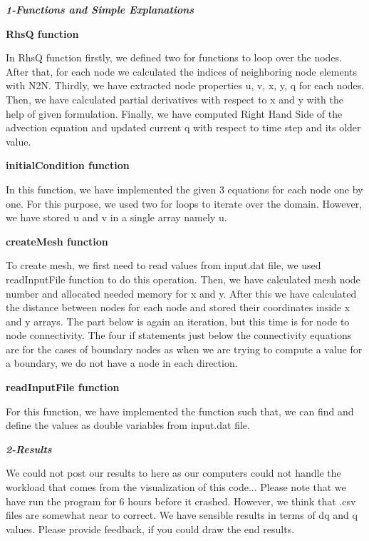 \documentclass[a4paper,12pt]{article} %
\begin{document}
\vspace{12pt}
\vspace{12pt}

{\Large \bf \textbf{\textit{1-Functions and Simple Explanations}}}
\vspace{12pt}
\vspace{12pt}

{\Large \textbf{RhsQ function}}

In RhsQ function firstly,  we defined two for functions to loop over the nodes. After that, for each node we calculated the indices of neighboring node elements with N2N. Thirdly, we have extracted node properties u, v, x, y, q for each nodes. Then, we have calculated partial derivatives with respect to x and y with the help of given formulation.  Finally, we have computed Right Hand Side of the advection equation and updated current q  with respect to time step and its older value.

\vspace{12pt}

{\Large \textbf{initialCondition function}}

In this function, we have implemented the given 3 equations for each node one by one. For this purpose, we used two for loops to iterate over the domain. However, we have stored u and v in a single array namely u.

\vspace{12pt}

{\Large \textbf{createMesh function}}

To create mesh, we first need to read values from input.dat file, we used readInputFile function to do this operation. Then, we have calculated mesh node number and allocated needed memory for x and y. After this we have calculated the distance between nodes for each node and stored their coordinates inside x and y arrays. The part below is again an iteration, but this time is for node to node connectivity. The four if statements just below the connectivity equations are for the cases of boundary nodes as when we are trying to compute a value for a boundary, we do not have a node in each direction.

\vspace{12pt}

{\Large \textbf{readInputFile function}}

For this function, we have implemented the function such that, we can find and define the values as double variables from input.dat file.

\vspace{12pt}

\newpage
{\Large \bf \textbf{\textit{2-Results}}}

\vspace{12pt}

We could not post our results to here as our computers could not handle the workload that comes from the visualization of this code... Please note that we have run the program for 6 hours before it crashed. However, we think that .csv files are somewhat near to correct. We have sensible results in terms of dq and q values.  Please provide feedback, if you could draw the end results.
\end{document}
